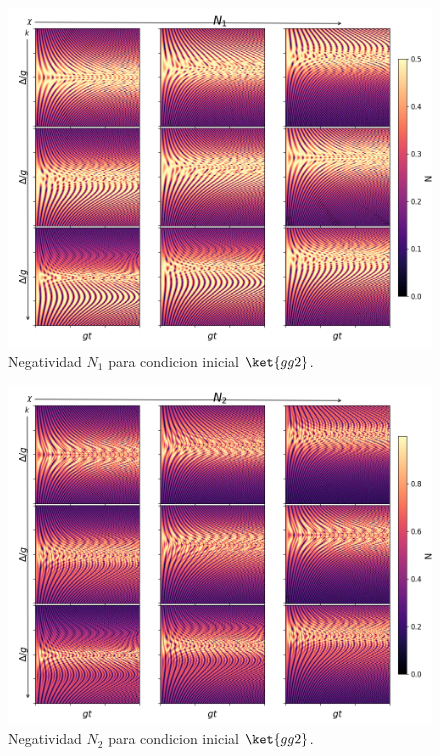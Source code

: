 \begin{figure}
    \centering
    \includegraphics[width=0.8\linewidth]{figuras/ch2/negatividad/3x3 gg2 $N_1$ 012 012.png}
    \caption{Negatividad $N_{1}$ para condicion inicial $\ket{gg2}$.}
    \label{fig2:N_1_gg2}
\end{figure}

\begin{figure}
    \centering
    \includegraphics[width=0.8\linewidth]{figuras/ch2/negatividad/3x3 gg2 $N_2$ 012 012.png}
    \caption{Negatividad $N_{2}$ para condicion inicial $\ket{gg2}$.}
    \label{fig2:N_2_gg2}
\end{figure}